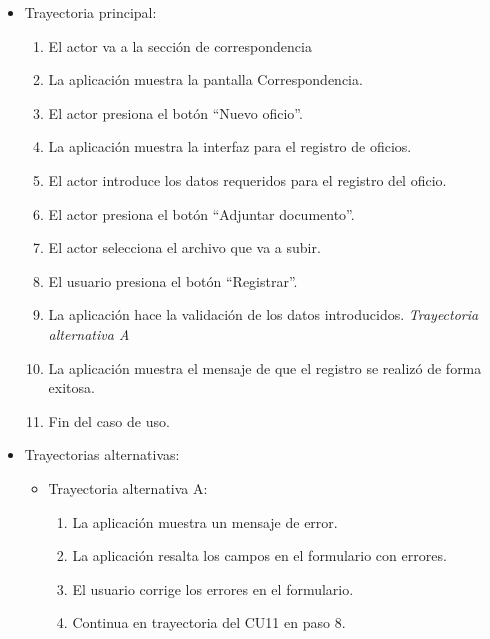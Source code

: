 \begin{itemize}
	\item Trayectoria principal:
	\begin{enumerate}
		\item El actor va a la sección de correspondencia 
		\item La aplicación muestra la pantalla  Correspondencia.
		\item El actor presiona el botón “Nuevo oficio”.
		\item La aplicación muestra la interfaz  para el registro de oficios.
		\item El actor introduce los datos requeridos para el registro del oficio.
		\item El actor presiona el botón “Adjuntar documento”.
		\item El actor selecciona el archivo que va a subir.
		\item El usuario presiona el botón “Registrar”. 
		\item La aplicación hace la validación de los datos introducidos. \textsl{Trayectoria alternativa A} 
		\item La aplicación muestra el mensaje  de que el registro se realizó de forma exitosa.
		\item Fin del caso de uso.
	\end{enumerate}
	
	\item Trayectorias alternativas:
	\begin{itemize}
		\item Trayectoria alternativa A:
			\begin{enumerate}
				\item La aplicación muestra un mensaje de error.
				\item La aplicación resalta los campos en el formulario con errores.
				\item El usuario corrige los errores en el formulario.
				\item Continua en trayectoria del CU11 en paso 8.
			\end{enumerate}
	\end{itemize}
\end{itemize}
\newpage
